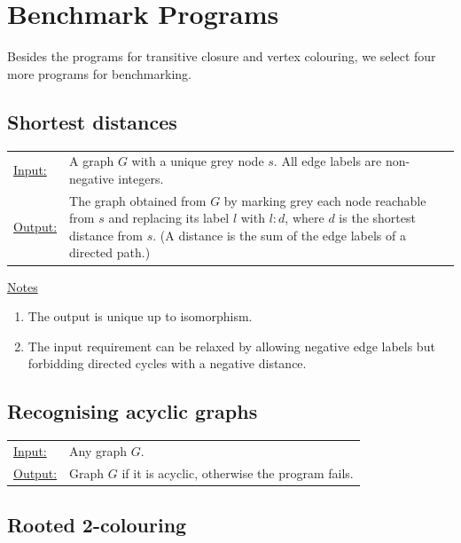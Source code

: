 \section{Benchmark Programs}
\label{sec:benchmark}
 
Besides the programs for transitive closure and vertex colouring, we select four more programs for benchmarking.


\subsection{Shortest distances}

\begin{tabular}{lp{10.5cm}}
\ul{Input:} & A graph $G$ with a unique grey node $s$. All edge labels are non-negative integers. \\
\ul{Output:} & The graph obtained from $G$ by marking grey each node reachable from $s$ and replacing its label $l$\/ with $l{:}d$, where $d$\/ is the shortest distance from $s$. (A distance is the sum of the edge labels of a directed path.)
\end{tabular}
  
\begin{center}

\end{center}

\ul{Notes}
\begin{enumerate}
\setlength{\itemsep}{-.5ex}
\item The output is unique up to isomorphism.
\item The input requirement can be relaxed by allowing negative edge labels but forbidding directed cycles with a negative distance.
\end{enumerate}


\subsection{Recognising acyclic graphs}
\label{sec:acyclic}

\begin{tabular}{lp{10.5cm}}
\ul{Input:} & Any graph $G$. \\
\ul{Output:} & Graph $G$ if it is acyclic, otherwise the program fails.
\end{tabular}
  
\begin{center}

\end{center}


\subsection{Rooted 2-colouring}

